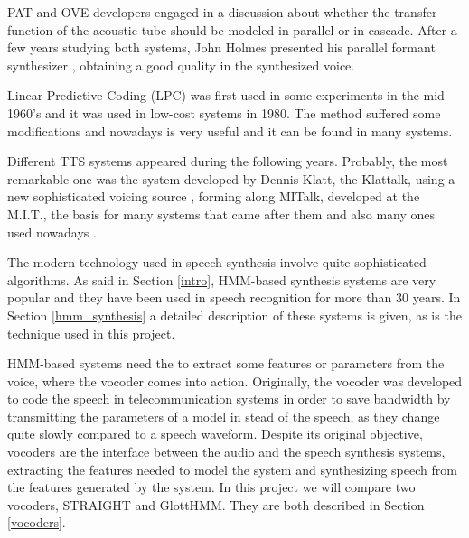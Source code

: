 PAT and OVE developers engaged in a discussion about whether the transfer function of the acoustic tube should be modeled in parallel or in cascade. After a few years studying both systems, John Holmes presented his parallel formant synthesizer \cite{Klatt87}, obtaining a good quality in the synthesized voice.

Linear Predictive Coding (LPC) was first used in some experiments in the mid 1960's \cite{Schroeder93} and it was used in low-cost systems in 1980. The method suffered some modifications and nowadays is very useful and it can be found in many systems. 

Different TTS systems appeared during the following years. Probably, the most remarkable one was the system developed by Dennis Klatt, the Klattalk, using a new sophisticated voicing source \cite{Klatt87}, forming along MITalk, developed at the M.I.T., the basis for many systems that came after them and also many ones used nowadays \cite{LemmettyMSc}.

The modern technology used in speech synthesis involve quite sophisticated algorithms. As said in Section \ref{intro}, HMM-based synthesis systems are very popular and they have been used in speech recognition for more than 30 years. In Section \ref{hmm_synthesis} a detailed description of these systems is given, as is the technique used in this project.

HMM-based systems need the to extract some features or parameters from the voice, where the vocoder comes into action. Originally, the vocoder was developed to code the speech in telecommunication systems in order to save bandwidth by transmitting the parameters of a model in stead of the speech, as they change quite slowly compared to a speech waveform. Despite its original objective, vocoders are the interface between the audio and the speech synthesis systems, extracting the features needed to model the system and synthesizing speech from the features generated by the system. In this project we will compare two vocoders, STRAIGHT and GlottHMM. They are both described in Section \ref{vocoders}. 